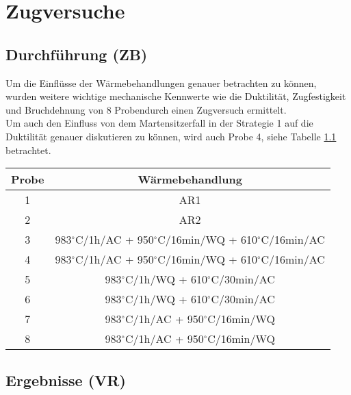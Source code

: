 \chapter{Zugversuche }


\section{Durchführung (ZB)}

Um die Einflüsse der Wärmebehandlungen genauer betrachten zu können, wurden weitere wichtige mechanische Kennwerte wie die Duktilität, Zugfestigkeit und Bruchdehnung von 8 Probendurch einen Zugversuch ermittelt. \\
Um auch den Einfluss von dem Martensitzerfall in der Strategie 1 auf die Duktilität genauer diskutieren zu können, wird auch Probe 4, siehe Tabelle \ref{tab:ubersicht} betrachtet.


\begin{table}[h]
	\centering
	\begin{tabular}{|c|c|}
		\hline 
		Probe & Wärmebehandlung \\ 
		\hline 
		1 & AR1 \\ 
		\hline 
		2 & AR2 \\ 
		\hline 
		3 &  983$^\circ$C/1h/AC + 950$^\circ$C/16min/WQ + 610$^\circ$C/16min/AC \\ 
		\hline 
		4 &  983$^\circ$C/1h/AC + 950$^\circ$C/16min/WQ + 610$^\circ$C/16min/AC \\ 
		\hline 
		5 &  983$^\circ$C/1h/WQ + 610$^\circ$C/30min/AC \\ 
		\hline 
		6 &  983$^\circ$C/1h/WQ + 610$^\circ$C/30min/AC \\ 
		\hline 
		7 &  983$^\circ$C/1h/AC + 950$^\circ$C/16min/WQ \\ 
		\hline 
		8 &  983$^\circ$C/1h/AC + 950$^\circ$C/16min/WQ \\ 
		\hline 
	\end{tabular}
	\label{tab:ubersicht} 
\end{table}

\section{Ergebnisse (VR)}

